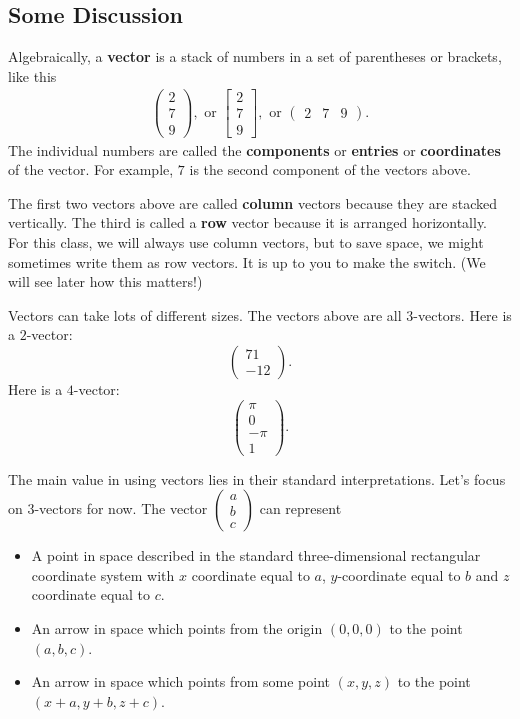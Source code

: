\documentclass[10pt,]{book}
\newcommand{\terminology}[1]{\textbf{#1}}
\theoremstyle{plain}
\numberwithin{equation}{section}
\begin{document}
\subsection[Some Discussion]{Some Discussion}\label{subsection-3}
Algebraically, a \terminology{vector} is a stack of numbers in a set of
     parentheses or brackets, like this\begin{align*}
\begin{pmatrix} 2 \\ 7 \\ 9 \end{pmatrix}, \text{ or }
          \begin{bmatrix}2 \\ 7 \\ 9 \end{bmatrix}, \text{ or }
          \begin{pmatrix} 2 & 7 & 9 \end{pmatrix}.
\end{align*}
     The individual numbers are called the \terminology{components} or \terminology{entries}
     or \terminology{coordinates} of the vector. For example, \(7\) is the second
     component of the vectors above.%
\par
The first two vectors above are called \terminology{column} vectors
        because they are stacked vertically. The third is called a \terminology{row} vector because it is arranged horizontally. For this class, we will always use column vectors, but to save space, we might sometimes write them as row vectors. It is up to you to make the switch. (We will see later how this matters!)%
\par
Vectors can take lots of different sizes. The vectors above are all \(3\)-vectors. Here is a \(2\)-vector: \[\begin{pmatrix} 71 \\ -12 \end{pmatrix}.\] Here is a \(4\)-vector: \[\begin{pmatrix} \pi \\ 0 \\ -\pi \\ 1\end{pmatrix}.\]%
\par
The main value in using vectors lies in their standard interpretations. Let's focus on \(3\)-vectors for now. The vector \(\left(\begin{smallmatrix} a \\ b \\ c\end{smallmatrix}\right)\) can represent \begin{itemize}
\item{}A point in space described in the standard three-dimensional rectangular coordinate system with \(x\) coordinate equal to \(a\), \(y\)-coordinate equal to \(b\) and \(z\) coordinate equal to \(c\).%
\item{}An arrow in space which points from the origin \((0,0,0)\) to the point \((a,b,c)\).%
\item{}An arrow in space which points from some point \((x,y,z)\) to the point \((x+a,y+b,z+c)\).%
\end{itemize}
\end{document}
